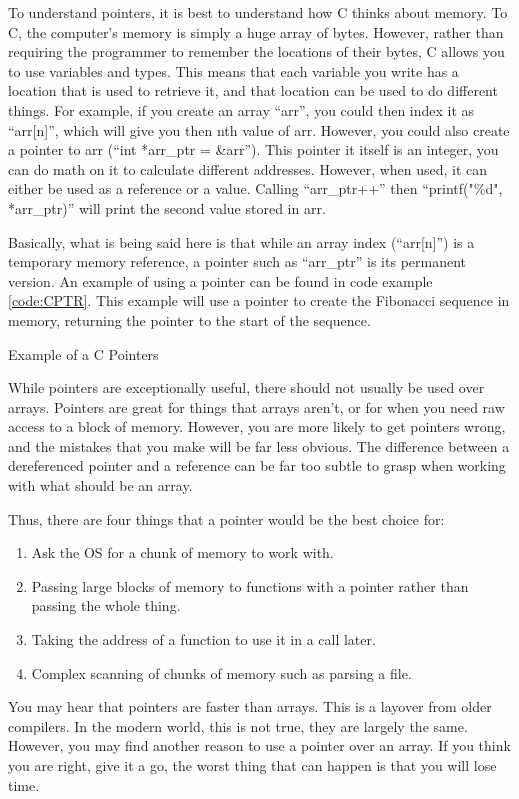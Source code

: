 			To understand pointers, it is best to understand how C thinks about memory.
			To C, the computer's memory is simply a huge array of bytes.
			However, rather than requiring the programmer to remember the locations of their bytes, C allows you to use variables and types.
			This means that each variable you write has a location that is used to retrieve it, and that location can be used to do different things.
			For example, if you create an array ``arr'', you could then index it as ``arr[n]'', which will give you then nth value of arr.
			However, you could also create a pointer to arr (``int *arr\_ptr = \&arr'').
			This pointer it itself is an integer, you can do math on it to calculate different addresses.
			However, when used, it can either be used as a reference or a value.
			Calling ``arr\_ptr++'' then ``printf("\%d", *arr\_ptr)'' will print the second value stored in arr.

			Basically, what is being said here is that while an array index (``arr[n]'') is a temporary memory reference, a pointer such as ``arr\_ptr'' is its permanent version.
			An example of using a pointer can be found in code example \ref{code:CPTR}.
			This example will use a pointer to create the Fibonacci sequence in memory, returning the pointer to the start of the sequence.
			\begin{code}
				\caption{Example of a C Pointers}
				\label{code:CPTR}
			\end{code}

			While pointers are exceptionally useful, there should not usually be used over arrays.
			Pointers are great for things that arrays aren't, or for when you need raw access to a block of memory.
			However, you are more likely to get pointers wrong, and the mistakes that you make will be far less obvious.
			The difference between a dereferenced pointer and a reference can be far too subtle to grasp when working with what should be an array.

			Thus, there are four things that a pointer would be the best choice for:
			\begin{enumerate}
				\item Ask the OS for a chunk of memory to work with.
				\item Passing large blocks of memory to functions with a pointer rather than passing the whole thing.
				\item Taking the address of a function to use it in a call later.
				\item Complex scanning of chunks of memory such as parsing a file.
			\end{enumerate}
			You may hear that pointers are faster than arrays.
			This is a layover from older compilers.
			In the modern world, this is not true, they are largely the same.
			However, you may find another reason to use a pointer over an array.
			If you think you are right, give it a go, the worst thing that can happen is that you will lose time.

